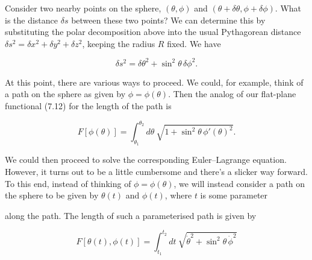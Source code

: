 \documentclass[11pt,a4paper,twoside]{article}
\newcommand{\pnum}[1]{\makebox[0pt][r]{\scriptsize\textbf{[#1]}\hspace{0.7em}}}
\newif\ifstudynotes
\newcommand{\StudyNote}[2]{\ifstudynotes\begin{studyNote}[title={#1}]#2\end{studyNote}\fi}
\begin{document}
\noindent\pnum{24}Consider two nearby points on the sphere, $(\theta,\phi)$ and $(\theta+\delta\theta,\phi+\delta\phi)$. What is the distance $\delta s$ between these two points? We can determine this by substituting the polar decomposition above into the usual Pythagorean distance $\delta s^2=\delta x^2+\delta y^2+\delta z^2$, keeping the radius $R$ fixed. We have

\begin{equation}
    \delta s^2=\delta\theta^2+\sin^2\theta\,\delta\phi^2.\tag{7.16}
\end{equation}

\noindent\pnum{25}At this point, there are various ways to proceed. We could, for example, think of a path on the sphere as given by $\phi=\phi(\theta)$. Then the analog of our flat-plane functional (7.12) for the length of the path is

\begin{equation}
    F[\phi(\theta)]=\int_{\theta_1}^{\theta_2}d\theta\ \sqrt{1+\sin^2\theta\,\phi'(\theta)^2}.\tag{7.17}
\end{equation}

\noindent\pnum{26}We could then proceed to solve the corresponding Euler--Lagrange equation. However, it turns out to be a little cumbersome and there's a slicker way forward. To this end, instead of thinking of $\phi=\phi(\theta)$, we will instead consider a path on the sphere to be given by $\theta(t)$ and $\phi(t)$, where $t$ is some parameter


\noindent along the path. The length of such a parameterised path is given by

\begin{equation}
    F[\theta(t),\phi(t)]=\int_{t_1}^{t_2}dt\ \sqrt{\dot\theta^2+\sin^2\theta\,\dot\phi^2}\tag{7.18}
\end{equation}

\StudyNote{複習註解：式 (7.18) 的參數化弧長}{
    改用參數 $t$ 描述路徑，令 $\theta=\theta(t)$、$\phi=\phi(t)$，則
    \[
        d\theta=\dot\theta\,dt,\qquad d\phi=\dot\phi\,dt.
    \]
    將它們代入單位球的弧長公式 (7.16)：
    \[
        \begin{aligned}
            ds^2 & =(d\theta)^2+\sin^2\theta\,(d\phi)^2                       \\
                 & =\left(\dot\theta^2+\sin^2\theta\,\dot\phi^2\right)(dt)^2.
        \end{aligned}
    \]
    讓 $t$ 沿路遞增，取平方根並積分：
    \[
        F[\theta(t),\phi(t)]=\int_{t_1}^{t_2}
        \sqrt{\dot\theta^2+\sin^2\theta\,\dot\phi^2}\,dt.
    \]
    這就是 (7.18)。$t$ 只是路徑參數，不一定是時間；點號表示對 $t$ 微分。

    \textbf{與 (7.17) 的關係：}若選擇 $t=\theta$，則
    \[
        \dot\theta=1,\qquad \dot\phi=\phi'(\theta),
    \]
    (7.18) 就回到 (7.17)。因此，原先根號內的 $1$，在一般參數下變成了 $\dot\theta^2$。
    若球半徑為一般的 $R$，上述弧長與總長度須再乘上 $R$。
}
\end{document}
